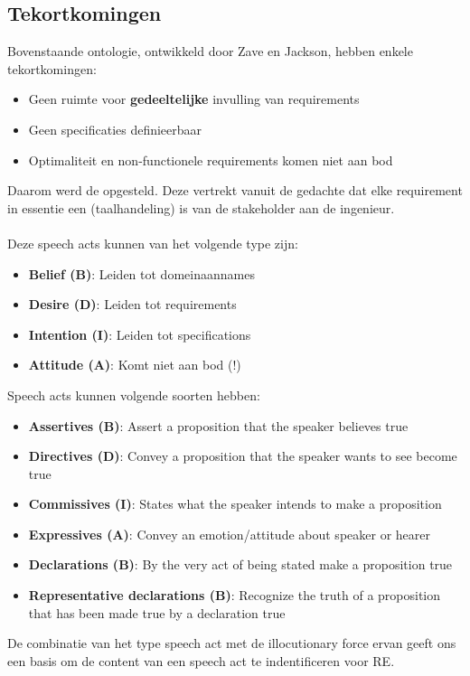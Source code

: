\documentclass[../../main.tex]{subfiles}
\begin{document}
\subsection{Tekortkomingen}
Bovenstaande ontologie, ontwikkeld door Zave en Jackson, hebben enkele tekortkomingen:
\begin{itemize}
	\item Geen ruimte voor \textbf{gedeeltelijke} invulling van requirements
	\item Geen specificaties definieerbaar
	\item Optimaliteit en non-functionele requirements komen niet aan bod
\end{itemize}
Daarom werd de  opgesteld. Deze vertrekt vanuit de gedachte dat elke requirement in essentie een  (taalhandeling) is van de stakeholder aan de ingenieur. \\
\\
Deze speech acts kunnen van het volgende type zijn:
\begin{itemize}
	\item \textbf{Belief (B)}: Leiden tot domeinaannames
	\item \textbf{Desire (D)}: Leiden tot requirements
	\item \textbf{Intention (I)}: Leiden tot specifications
	\item \textbf{Attitude (A)}: Komt niet aan bod (!)
\end{itemize}
Speech acts kunnen volgende soorten  hebben:
\begin{itemize}
	\item \textbf{Assertives (B)}: Assert a proposition that the speaker believes true
	\item \textbf{Directives (D)}: Convey a proposition that the speaker wants to see become true
	\item \textbf{Commissives (I)}: States what the speaker intends to make a proposition
	\item \textbf{Expressives (A)}: Convey an emotion/attitude about speaker or hearer
	\item \textbf{Declarations (B)}: By the very act of being stated make a proposition true
	\item \textbf{Representative declarations (B)}: Recognize the truth of a proposition that has been made true by a declaration true
\end{itemize}
De combinatie van het type speech act met de illocutionary force ervan geeft ons een basis om de content van een speech act te indentificeren voor RE.
\end{document}
